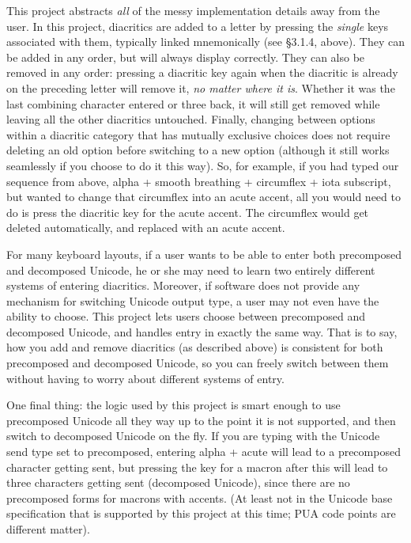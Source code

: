 \documentclass[11pt]{article}
\begin{document}
This project abstracts \emph{all} of the messy implementation details away from the user. In this project, diacritics are added to a letter by pressing the \emph{single} keys associated with them, typically linked mnemonically (see §3.1.4, above). They can be added in any order, but will always display correctly. They can also be removed in any order: pressing a diacritic key again when the diacritic is already on the preceding letter will remove it, \emph{no matter where it is}. Whether it was the last combining character entered or three back, it will still get removed while leaving all the other diacritics untouched. Finally, changing between options within a diacritic category that has mutually exclusive choices does not require deleting an old option before switching to a new option (although it still works seamlessly if you choose to do it this way). So, for example, if you had typed our sequence from above, alpha + smooth breathing + circumflex + iota subscript, but wanted to change that circumflex into an acute accent, all you would need to do is press the diacritic key for the acute accent. The circumflex would get deleted automatically, and replaced with an acute accent.

For many keyboard layouts, if a user wants to be able to enter both precomposed and decomposed Unicode, he or she may need to learn two entirely different systems of entering diacritics. Moreover, if software does not provide any mechanism for switching Unicode output type, a user may not even have the ability to choose. This project lets users choose between precomposed and decomposed Unicode, and handles entry in exactly the same way. That is to say, how you add and remove diacritics (as described above) is consistent for both precomposed and decomposed Unicode, so you can freely switch between them without having to worry about different systems of entry.

One final thing: the logic used by this project is smart enough to use precomposed Unicode all they way up to the point it is not supported, and then switch to decomposed Unicode on the fly. If you are typing with the Unicode send type set to precomposed, entering alpha + acute will lead to a precomposed character getting sent, but pressing the key for a macron after this will lead to three characters getting sent (decomposed Unicode), since there are no precomposed forms for macrons with accents. (At least not in the Unicode base specification that is supported by this project at this time; PUA code points are different matter).
\end{document}
